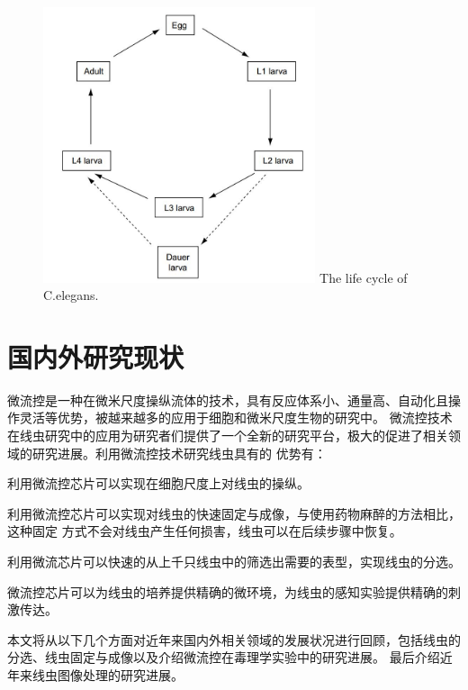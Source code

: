 	\begin{figure}[h]
	  \centering
	  \includegraphics[width=8cm]{figure/chap1/lifecycle.jpg}
		{The life cycle of C.elegans.}
	  \label{fig:lifecycle}
	\end{figure}
	
\section{国内外研究现状}
\label{sec:intro:analog}
	微流控是一种在微米尺度操纵流体的技术，具有反应体系小、通量高、自动化且操作灵活等优势，被越来越多的应用于细胞和微米尺度生物的研究中。
	微流控技术在线虫研究中的应用为研究者们提供了一个全新的研究平台，极大的促进了相关领域的研究进展。利用微流控技术研究线虫具有的
	优势有：\begin{enumerate*}[label=\itshape\alph*)\upshape]
	\item 利用微流控芯片可以实现在细胞尺度上对线虫的操纵。\quad
	\item 利用微流控芯片可以实现对线虫的快速固定与成像，与使用药物麻醉的方法相比，这种固定
		方式不会对线虫产生任何损害，线虫可以在后续步骤中恢复。\quad
	\item 利用微流芯片可以快速的从上千只线虫中的筛选出需要的表型，实现线虫的分选。\quad
	\item 微流控芯片可以为线虫的培养提供精确的微环境，为线虫的感知实验提供精确的刺激传达。\quad
\end{enumerate*}
	本文将从以下几个方面对近年来国内外相关领域的发展状况进行回顾，包括线虫的分选、线虫固定与成像以及介绍微流控在毒理学实验中的研究进展。
	最后介绍近年来线虫图像处理的研究进展。
	
